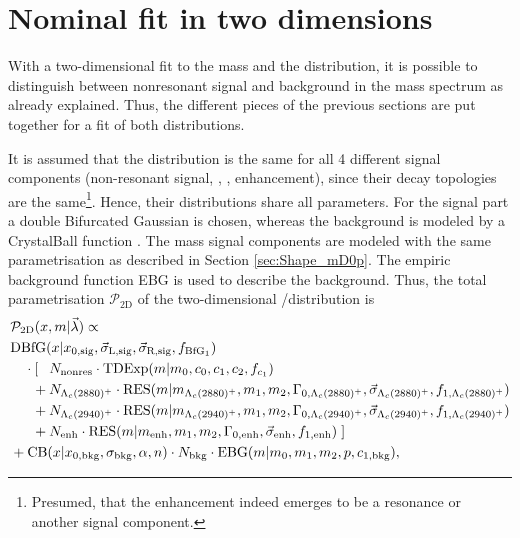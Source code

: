 \section{Nominal fit in two dimensions}
\label{sec:Fit_2D}
With a two-dimensional fit to the \Dz\proton mass and the \logIP distribution, it is possible to distinguish between nonresonant signal and background in the \Dz\proton mass spectrum as already explained.
Thus, the different pieces of the previous sections are put together for a fit of both distributions.

It is assumed that the \logIP distribution is the same for all 4 different signal components (non-resonant signal, \LcResI, \LcResII, enhancement), since their decay topologies are the same\footnote{Presumed, that the enhancement indeed emerges to be a resonance or another signal component.}.
Hence, their \logIP distributions share all parameters. 
For the \logIP signal part a double Bifurcated Gaussian \DBfG is chosen, whereas the background is modeled by a CrystalBall function \CB.
The \Dz\proton mass signal components are modeled with the same parametrisation as described in Section \ref{sec:Shape_mD0p}. 
The empiric background function EBG is used to describe the background.
Thus, the total parametrisation $\mathcal{P}_\text{2D}$ of the two-dimensional \logIP/\MDp distribution is
\begin{align}
    & \mathcal{P}_\text{2D}(x, m | \vec{\lambda}) \propto \nonumber \\
    & \text{DBfG}(x|x_{0, \text{sig}}, \vec{\sigma}_{\text{L,sig}}, \vec{\sigma}_{\text{R,sig}}, f_{\text{BfG}_1}) \nonumber \\
    & \quad \cdot \left[\phantom{+} N_\text{nonres} \cdot \text{TDExp}(m|m_0, c_0, c_1, c_2, f_{c_1}) \right. \nonumber \\
    & \quad \phantom{\cdot [} + N_{{\Lambda}_{c}(2880)^+} \cdot \text{RES}(m| m_{{\Lambda}_{c}(2880)^+}, m_1, m_2, \Gamma_{0, {\Lambda}_{c}(2880)^+}, \vec{\sigma}_{{\Lambda}_{c}(2880)^+}, f_{1, {\Lambda}_{c}(2880)^+}) \nonumber \\
    & \quad \phantom{\cdot [} + N_{{\Lambda}_{c}(2940)^+} \cdot \text{RES}(m| m_{{\Lambda}_{c}(2940)^+}, m_1, m_2, \Gamma_{0, {\Lambda}_{c}(2940)^+}, \vec{\sigma}_{{\Lambda}_{c}(2940)^+}, f_{1, {\Lambda}_{c}(2940)^+}) \nonumber \\
    & \quad \phantom{\cdot [} + N_\text{enh} \cdot \text{RES}(m| m_\text{enh}, m_1, m_2, \Gamma_{0, \text{enh}}, \vec{\sigma}_{\text{enh}}, f_{1, \text{enh}})\left.\right] \nonumber \\
    & + \text{CB}(x| x_{0, \text{bkg}}, \sigma_\text{bkg}, \alpha, n) \cdot N_\text{bkg} \cdot \text{EBG}(m|m_0, m_1, m_2, p,c_{1, \text{bkg}}),
\end{align}
